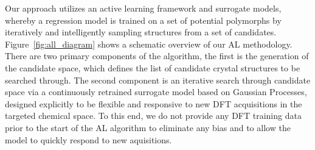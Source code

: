 %
%
%
%



%
%
Our approach utilizes an active learning framework and surrogate models,
whereby a regression model is trained on a set of potential polymorphs by iteratively and intelligently sampling structures from a set of candidates.
%
Figure~\ref{fig:all_diagram} shows a schematic overview of our AL methodology.
%
There are two primary components of the algorithm, the first is the generation of the candidate space,
which defines the list of candidate crystal structures to be searched through.
%
The second component is an iterative search through candidate space via a continuously retrained surrogate model based on Gaussian Processes,
designed explicitly to be flexible and responsive to new DFT acquisitions in the targeted chemical space.
%
To this end, we do not provide any DFT training data prior to the start of the AL algorithm to eliminate any bias and to allow the model to quickly respond to new aquisitions.


